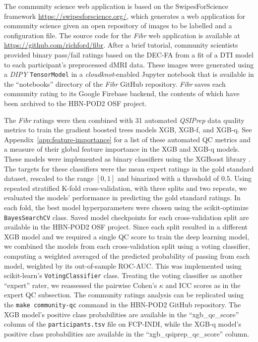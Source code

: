\documentclass[fleqn,10pt,inline]{wlscirep}
\begin{document}
The community science web application is based on the SwipesForScience framework
\url{https://swipesforscience.org/}, which generates a web application for
community science given an open repository of images to be labelled and a
configuration file. The source code for the \emph{Fibr} web application is
available at \url{https://github.com/richford/fibr}. After a brief tutorial,
community scientists provided binary pass/fail ratings based on the DEC-FA from
a fit of a DTI model to each participant's preprocessed dMRI data. These images were
generated using a \emph{DIPY} \cite{dipy} \texttt{TensorModel} in a
\emph{cloudknot}-enabled Jupyter notebook that is available in the ``notebooks''
directory of the \emph{Fibr} GitHub repository. \emph{Fibr} saves each community
rating to its Google Firebase backend, the contents of which have been archived
to the HBN-POD2 OSF project.

The \emph{Fibr} ratings were then combined with 31 automated \emph{QSIPrep} data quality
metrics to train the gradient boosted trees models XGB, XGB-f, and XGB-q. See Appendix~\ref{app:feature-importance} for a list of these automated QC metrics and a measure of their global feature importance in the XGB and XGB-q models. These
models were implemented as binary classifiers using the XGBoost library
\cite{xgboost}. The targets for these classifiers were the mean expert ratings
in the gold standard dataset, rescaled to the range $[0, 1]$ and binarized with
a threshold of $0.5$. Using repeated
stratified K-fold cross-validation, with three splits and two repeats, we
evaluated the models' performance in predicting the gold standard ratings. In
each fold, the best model hyperparameters were chosen using the scikit-optimize
\cite{scikit-optimize} \texttt{BayesSearchCV} class. Saved model checkpoints for
each cross-validation split are available in the HBN-POD2 OSF project. Since
each split resulted in a different XGB model and we required a single QC score
to train the deep learning model, we combined the models from each
cross-validation split using a voting classifier, computing a weighted averaged
of the predicted probability of passing from each model, weighted by its
out-of-sample ROC-AUC. This was implemented using scikit-learn's
\texttt{VotingClassifier} class. Treating the voting classifier as another
``expert'' rater, we reassessed the pairwise Cohen's $\kappa$ and ICC scores as
in the expert QC subsection. The community ratings analysis can be replicated
using the \texttt{make community-qc} command in the HBN-POD2 GitHub repository.
The XGB model's positive class probabilities are available in the
``xgb\_qc\_score'' column of the \texttt{participants.tsv} file on FCP-INDI, while
the XGB-q model's positive class probabilities are available in the
``xgb\_qsiprep\_qc\_score'' column.
\end{document}
